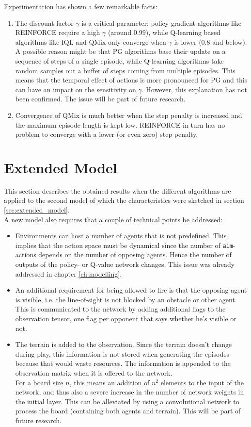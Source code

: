 Experimentation has shown a few remarkable facts:
\begin{enumerate}
    \item The discount factor $\gamma$ is a critical parameter: policy gradient algorithms like REINFORCE require a high $\gamma$ (around $0.99$), while Q-learning based algorithms like IQL and QMix only converge when $\gamma$ is lower ($0.8$ and below). A possible reason might be that PG algorithms base their update on a sequence of steps of a single episode, while Q-learning algorithms take random samples out a buffer of steps coming from multiple episodes. This means that the temporal effect of actions is more pronounced for PG and this can have an impact on the sensitivity on $\gamma$. However, this explanation has not been confirmed. The issue will be part of future research.
    \item Convergence of QMix is much better when the step penalty is increased and the maximum episode length is kept low. REINFORCE in turn has no problem to converge with a lower (or even zero) step penalty.
\end{enumerate}

\section{Extended Model}
\label{sec:init_model_applied}
This section describes the obtained results when the different algorithms are applied to the second model of which the characteristics were sketched in section \ref{sec:extended_model}.\\
A new model also requires that a couple of technical points be addressed:
\begin{itemize}
    \item Environments can host a number of agents that is not predefined. This implies that the action space must be dynamical since the number of {\tt aim}-actions depends on the number of opposing agents. Hence the number of outputs of the policy- or Q-value network changes. This issue was already addressed in chapter \ref{ch:modelling}.
    \item An additional requirement for being allowed to fire is that the opposing agent is visible, i.e. the line-of-sight is not blocked by an obstacle or other agent. This is communicated to the network by adding additional flags to the observation tensor, one flag per opponent that says whether he's visible or not.
    \item The terrain is added to the observation. Since the terrain doesn't change during play, this information is not stored when generating the episodes because that would waste resources. The information is appended to the observation matrix when it is offered to the network.\\
    For a board size $n$, this means an addition of $n^2$ elements to the input of the network, and thus also a severe increase in the number of network weights in the initial layer. This can be alleviated by using a convolutional network to process the board (containing both agents and terrain). This will be part of future research.
\end{itemize}

